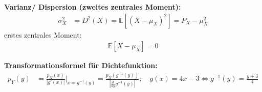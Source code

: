 \textbf{Varianz/ Dispersion (zweites zentrales Moment):}
\begin{align}
\sigma_X^2 &= D^2(X) = \mathbb{E}[(X-\mu_X)^2] = P_X - \mu_X^2
\end{align}
erstes zentrales Moment:
\begin{align}
\mathbb{E}[X-\mu_X] = 0
\end{align}

\textbf{Transformationsformel für Dichtefunktion:}
\begin{align}
p_Y(y) &= \frac{p_X(x)}{|g'(x)|} |_{x=g^{-1}(y)} = \frac{p_X(g^{-1}(y))}{ \left|\frac{d}{dy}g^{-1}(y)\right|}; \quad g(x) = 4x-3 \Leftrightarrow
g^{-1}(y) = \frac{y+3}{4} 
\end{align}

